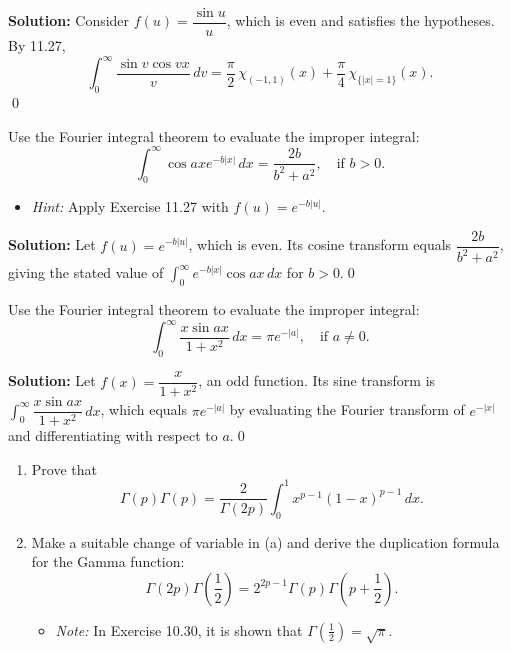 \noindent\textbf{Solution:}
Consider $f(u)=\dfrac{\sin u}{u}$, which is even and satisfies the hypotheses. By 11.27,
\[\int_0^{\infty}\frac{\sin v\cos vx}{v}\,dv=\frac{\pi}{2}\,\chi_{(-1,1)}(x)+\frac{\pi}{4}\,\chi_{\{|x|=1\}}(x).\]\qed


\begin{problembox}
Use the Fourier integral theorem to evaluate the improper integral:
\[
\int_0^\infty \cos ax e^{-b|x|} \, dx = \frac{2b}{b^2 + a^2}, \quad \text{if } b > 0.
\]
\begin{itemize}
\item \textit{Hint:} Apply Exercise 11.27 with $f(u) = e^{-b|u|}$.
\end{itemize}
\end{problembox}

\noindent\textbf{Solution:}
Let $f(u)=e^{-b|u|}$, which is even. Its cosine transform equals $\dfrac{2b}{b^2+a^2}$, giving the stated value of $\int_0^{\infty}e^{-b|x|}\cos ax\,dx$ for $b>0$.\qed


\begin{problembox}
Use the Fourier integral theorem to evaluate the improper integral:
\[
\int_0^\infty \frac{x \sin ax}{1 + x^2} \, dx = \pi e^{-|a|}, \quad \text{if } a \neq 0.
\]
\end{problembox}

\noindent\textbf{Solution:}
Let $f(x)=\dfrac{x}{1+x^2}$, an odd function. Its sine transform is $\int_0^{\infty}\dfrac{x\sin ax}{1+x^2}\,dx$, which equals $\pi e^{-|a|}$ by evaluating the Fourier transform of $e^{-|x|}$ and differentiating with respect to $a$.\qed


\begin{problembox}
\begin{enumerate}[label=(\alph*)]
\item Prove that
\[
\Gamma(p) \Gamma(p) = \frac{2}{\Gamma(2p)} \int_0^1 x^{p-1} (1 - x)^{p-1} \, dx.
\]
\item Make a suitable change of variable in (a) and derive the duplication formula for the Gamma function:
\[
\Gamma(2p) \Gamma\left(\frac{1}{2}\right) = 2^{2p-1} \Gamma(p) \Gamma\left(p + \frac{1}{2}\right).
\]
\begin{itemize}
\item \textit{Note:} In Exercise 10.30, it is shown that $\Gamma\left(\frac{1}{2}\right) = \sqrt{\pi}$.
\end{itemize}
\end{enumerate}
\end{problembox}

